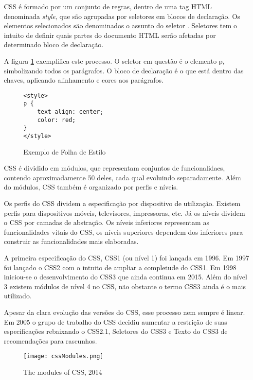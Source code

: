 CSS é formado por um conjunto de regras,
dentro de uma tag HTML denominada \textit{style}, que são agrupadas
por seletores em blocos de declaração. Os elementos selecionados são
denominados o assunto do seletor \autocite{cssSelectors}. Seletores tem
o intuito de definir quais partes do documento HTML serão afetadas por
determinado bloco de declaração.

A figura \ref{fig:CSSSample} exemplifica este processo. O seletor em
questão é o elemento p, simbolizando todos os parágrafos. O bloco de declaração
é o que está dentro das chaves, aplicando alinhamento e cores aos parágrafos.

\begin{figure}
\centering
\begin{verbatim}
<style>
p {
    text-align: center;
    color: red;
}
</style>
\end{verbatim}
\caption{Exemplo de Folha de Estilo}
\label{fig:CSSSample}
\end{figure}

CSS é dividido em módulos, que representam conjuntos de
funcionalidaes, contendo aproximadamente 50 deles, cada qual evoluindo
separadamente. Além do módulos, CSS também é organizado por perfis e
níveis.

Os perfis do CSS dividem a especificação por dispositivo de
utilização. Existem perfis para dispositivos móveis, televisores,
impressoras, etc. Já os níveis dividem o CSS por camadas de
abstração. Os níveis inferiores representam as funcionalidades vitais
do CSS, os níveis superiores dependem dos inferiores para construir as
funcionalidades mais elaboradas.

A primeira especificação do CSS, CSS1 (ou nível 1) foi lançada em
1996. Em 1997 foi lançado o CSS2 com o intuito de ampliar a completude
do CSS1. Em 1998 iniciou-se o desenvolvimento do CSS3 que ainda continua
em 2015. Além do nível 3 existem módulos de nível 4 no CSS, não
obstante o termo CSS3 ainda é o mais utilizado.

Apesar da clara evolução das versões do CSS, esse processo nem sempre é linear.
Em 2005 o grupo de trabalho do CSS decidiu aumentar a restrição de suas especificações
rebaixando o CSS2.1, Seletores do CSS3 e Texto do CSS3 de recomendações para rascunhos.

\begin{figure}
    \centering
    \texttt{[image: cssModules.png]}
	\caption{The modules of CSS, 2014}
\end{figure}

